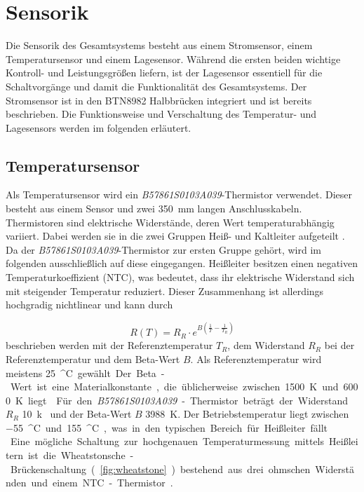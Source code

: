\section{Sensorik}
Die Sensorik des Gesamtsystems besteht aus einem Stromsensor, einem Temperatursensor und einem Lagesensor. Während die ersten beiden wichtige Kontroll- und Leistungsgrößen liefern, ist der Lagesensor essentiell für die Schaltvorgänge und damit die Funktionalität des Gesamtsystems. Der Stromsensor ist in den BTN8982 Halbbrücken integriert und ist bereits beschrieben. Die Funktionsweise und Verschaltung des Temperatur- und Lagesensors werden im folgenden erläutert. 

\subsection{Temperatursensor}\label{sub:temp}
Als Temperatursensor wird ein \textit{B57861S0103A039}-Thermistor verwendet. Dieser besteht aus einem Sensor und zwei \SI{350}{mm} langen Anschlusskabeln. Thermistoren sind elektrische Widerstände, deren Wert temperaturabhängig variiert. Dabei werden sie in die zwei Gruppen Heiß- und Kaltleiter aufgeteilt \cite{Stiny2015}. Da der \textit{B57861S0103A039}-Thermistor zur ersten Gruppe gehört, wird im folgenden ausschließlich auf diese eingegangen. Heißleiter besitzen einen negativen Temperaturkoeffizient (NTC), was bedeutet, dass ihr elektrische Widerstand sich mit steigender Temperatur reduziert. Dieser Zusammenhang ist allerdings hochgradig nichtlinear und kann durch 

\begin{equation} \label{eq:NTC}
R(T) = R_R \cdot e^{B\left(\frac{1}{T}-\frac{1}{T_R}\right)}  
\end{equation}
beschrieben werden mit der Referenztemperatur $T_R$, dem Widerstand $R_R$ bei der Referenztemperatur und dem Beta-Wert $B$. Als Referenztemperatur wird meistens \SI{25}{^\circ C} gewählt. Der Beta-Wert ist eine Materialkonstante, die üblicherweise zwischen \SI{1500}{K} und \SI{6000}{K} liegt \cite{Stiny2015}. Für den \textit{B57861S0103A039}-Thermistor beträgt der Widerstand $R_R$ \SI{10}{k\Omega} und der Beta-Wert $B$ \SI{3988}{K}. Der Betriebstemperatur liegt zwischen \SI{-55}{^\circ C} und \SI{155}{^\circ C}, was in den typischen Bereich für Heißleiter fällt \cite{Stiny2015}.\\
Eine mögliche Schaltung zur hochgenauen Temperaturmessung mittels Heißleitern ist die Wheatstonsche-Brückenschaltung (\autoref{fig:wheatstone}) bestehend aus drei ohmschen Widerständen und einem NTC-Thermistor \cite{Stiny2015}.

